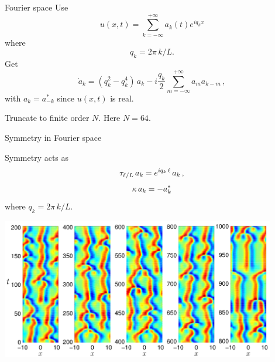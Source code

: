 \documentclass{beamer}
\begin{document}
\begin{frame}{Fourier space}
Use
\[
  u(x,t)=\sum_{k=-\infty}^{+\infty} a_k (t) e^{ i q_k x }
\]
where
\[
 q_k = 2\pi\,k/L.
\]
Get
\[
 \dot{a}_k
     = ( q_k^2 - q_k^4 )\, a_k
    - i \frac{q_k}{2} \sum_{m=-\infty}^{+\infty} a_m a_{k-m}\,,
\]
with $a_{k}=a^\ast_{-k}$ since $u(x,t)$ is real.

Truncate to finite order $N$. Here $N=64$.
\end{frame}

\begin{frame}{Symmetry in Fourier space}

Symmetry acts as
\[
  \tau_{\ell/L}\, a_k = e^{i q_k\, \ell} \, a_k \,,
  \label{eq:shiftF}
\]
\[
   \kappa \, a_k = -a_k^\ast
\]
where $q_k = 2\pi\,k/L$.

\end{frame}


\begin{frame}{}
\begin{center}
  \includegraphics[width=0.9\textwidth]{../../figs/ks_L22_long_orbit}
\end{center} 
\end{frame}
\end{document}
